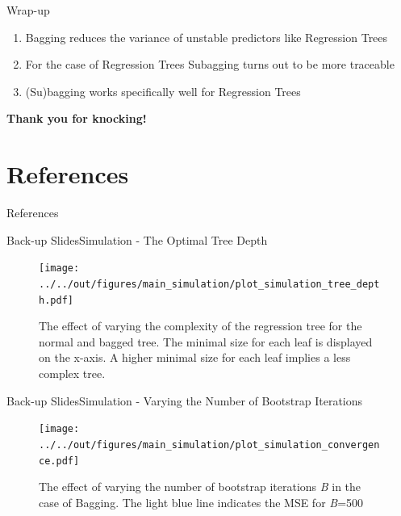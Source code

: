 \documentclass{beamer}
\begin{document}

\begin{frame}{Wrap-up}
\begin{enumerate}
\item Bagging reduces the variance of unstable predictors like Regression Trees
\item For the case of Regression Trees Subagging turns out to be more traceable
\item (Su)bagging works specifically well for Regression Trees
\end{enumerate}
\end{frame}

\begin{frame}
\begin{center}
\textbf{Thank you for knocking!
}\end{center}

\end{frame}



\section{References}
\begin{frame}{References}


\end{frame}


\appendix

\begin{frame}{Back-up Slides}{Simulation - The Optimal Tree Depth}
\begin{center}
\begin{figure}
\texttt{[image: ../../out/figures/main\_simulation/plot\_simulation\_tree\_depth.pdf]}
\caption{The effect of varying the complexity of the regression tree for the normal and bagged tree. The minimal size for each leaf is displayed on the x-axis. A higher minimal size for each leaf implies a less complex tree.}
\end{figure}
\end{center}
\end{frame}


\begin{frame}{Back-up Slides}{Simulation - Varying the Number of Bootstrap Iterations}
\begin{center}
\begin{figure}


\texttt{[image: ../../out/figures/main\_simulation/plot\_simulation\_convergence.pdf]}
\caption{The effect of varying the number of bootstrap iterations \textit{B} in the case of Bagging. The light blue line indicates the MSE for \textit{B}=500}
\end{figure}
\end{center}
\end{frame}
\end{document}
